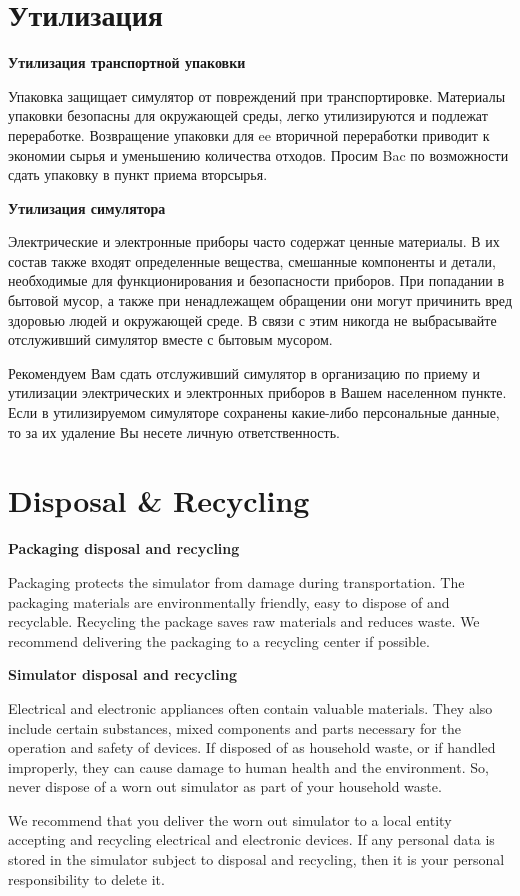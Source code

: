 \ifIsLngRus  %
{
    \section{Утилизация}

    \textbf{Утилизация транспортной упаковки}
    
    Упаковка защищает симулятор от повреждений при транспортировке. Материалы упаковки безопасны для
    окружающей среды, легко утилизируются и подлежат переработке.
    Возвращение упаковки для ee вторичной переработки приводит к экономии сырья и уменьшению количества отходов.
    Просим Bac по возможности сдать упаковку в пункт приема вторсырья.
    
    \textbf{Утилизация симулятора}
    
    Электрические и электронные приборы часто содержат ценные материалы. 
    В их состав также входят определенные вещества, смешанные компоненты и детали, 
    необходимые для функционирования и безопасности приборов. При попадании в бытовой
    мусор, а также при ненадлежащем обращении они могут причинить вред здоровью людей и окружающей среде.
    В связи с этим никогда не выбрасывайте отслуживший симулятор вместе с бытовым мусором.
    
    Рекомендуем Вам сдать отслуживший симулятор в организацию по приему и утилизации электрических и
    электронных приборов в Вашем населенном пункте. Если в утилизируемом симуляторе сохранены какие-либо
    персональные данные, то за их удаление Вы несете личную ответственность.  
    \pagebreak   
}
\fi

\ifIsLngEng  %
{
    \section{Disposal \& Recycling}

    \textbf{Packaging disposal and recycling}

    Packaging protects the simulator from damage during transportation. The packaging materials are environmentally friendly, easy to dispose of and recyclable.
    Recycling the package saves raw materials and reduces waste.
    We recommend delivering the packaging to a recycling center if possible.

    \textbf{Simulator disposal and recycling}

    Electrical and electronic appliances often contain valuable materials. 
    They also include certain substances, mixed components and parts necessary for the operation and safety of devices. 
    If disposed of as household waste, or if handled improperly, they can cause damage to human health and the environment.
    So, never dispose of a worn out simulator as part of your household waste.

    We recommend that you deliver the worn out simulator to a local entity accepting and recycling electrical and electronic devices. 
    If any personal data is stored in the simulator subject to disposal and recycling, then it is your personal responsibility to delete it. 
    \pagebreak
}
\fi



